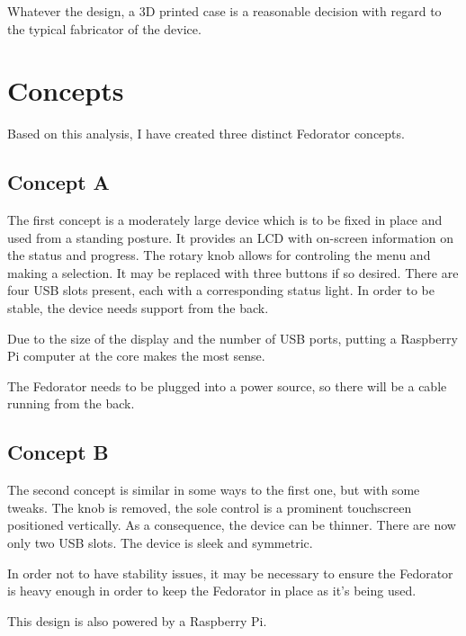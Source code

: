         Whatever the design, a 3D printed case is a reasonable decision with regard to the typical fabricator of the device.
        
    \section{Concepts}
        Based on this analysis, I have created three distinct Fedorator concepts.
        \newpage
        
        \subsection{Concept A}
            The first concept is a moderately large device which is to be fixed in place and used from a standing posture.  It provides an LCD with on-screen information on the status and progress.  The rotary knob allows for controling the menu and making a selection.  It may be replaced with three buttons if so desired.  There are four USB slots present, each with a corresponding status light.  In order to be stable, the device needs support from the back.
            
            Due to the size of the display and the number of USB ports, putting a Raspberry Pi computer at the core makes the most sense.
            
            The Fedorator needs to be plugged into a power source, so there will be a cable running from the back.
            \newpage
        
        \subsection{Concept B}
            The second concept is similar in some ways to the first one, but with some tweaks.  The knob is removed, the sole control is a prominent touchscreen positioned vertically.  As a consequence, the device can be thinner.  There are now only two USB slots.  The device is sleek and symmetric.
            
            In order not to have stability issues, it may be necessary to ensure the Fedorator is heavy enough in order to keep the Fedorator in place as it's being used.
            
            This design is also powered by a Raspberry Pi.
            \newpage
        
